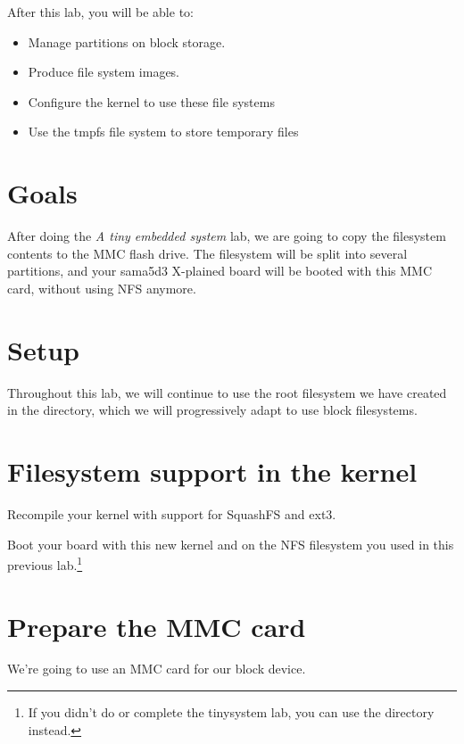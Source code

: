 
After this lab, you will be able to:
\begin{itemize}
\item Manage partitions on block storage.
\item Produce file system images.
\item Configure the kernel to use these file systems
\item Use the tmpfs file system to store temporary files
\end{itemize}

\section{Goals}

After doing the {\em A tiny embedded system} lab, we are going to copy
the filesystem contents to the MMC flash drive. The filesystem will be
split into several partitions, and your sama5d3 X-plained board will
be booted with this MMC card, without using NFS anymore.

\section{Setup}

Throughout this lab, we will continue to use the root filesystem we
have created in the 
directory, which we will progressively adapt to use block filesystems.

\section{Filesystem support in the kernel}

Recompile your kernel with support for SquashFS and ext3.

Boot your board with this new kernel and on the NFS filesystem you
used in this previous lab.\footnote{If you didn't do or complete the
  tinysystem lab, you can use the  directory
  instead.}

\section{Prepare the MMC card}

We're going to use an MMC card for our block device.

